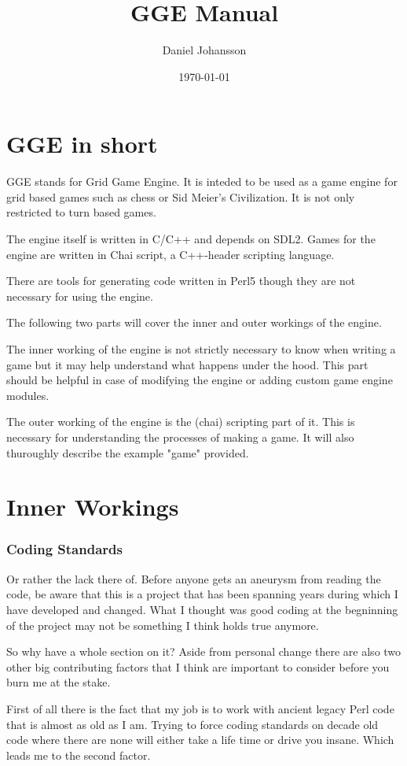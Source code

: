 \documentclass{article}
\title{GGE Manual}
\author{Daniel Johansson}
\date{\today}
\begin{document}
\maketitle
\tableofcontents
\part{GGE in short}
GGE stands for Grid Game Engine. It is inteded to be used as a game engine for grid based games such as chess or Sid Meier's Civilization. It is not only restricted to turn based games.

The engine itself is written in C/C++ and depends on SDL2. Games for the engine are written in Chai script, a C++-header scripting language.

There are tools for generating code written in Perl5 though they are not necessary for using the engine.

The following two parts will cover the inner and outer workings of the engine.

The inner working of the engine is not strictly necessary to know when writing a game but it may help understand what happens under the hood. 
This part should be helpful in case of modifying the engine or adding custom game engine modules.

The outer working of the engine is the (chai) scripting part of it. This is necessary for understanding the processes of making a game.
It will also thuroughly describe the example "game" provided.

\part{Inner Workings}

\section{Coding Standards}
Or rather the lack there of. Before anyone gets an aneurysm from reading the code, be aware that this is a project that has been spanning years during which I have developed and changed. What I thought was good coding at the begninning of the
project may not be something I think holds true anymore. 

So why have a whole section on it? 
Aside from personal change there are also two other big contributing factors that I think are important to consider before you burn me at the stake.

First of all there is the fact that my job is to work with ancient legacy Perl code that is almost as old as I am. 
Trying to force coding standards on decade old code where there are none will either take a life time or drive you insane.
Which leads me to the second factor.
\end{document}
